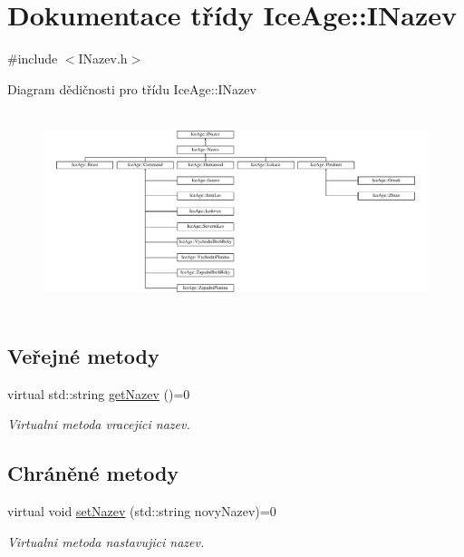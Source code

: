 \hypertarget{classIceAge_1_1INazev}{}\section{Dokumentace třídy Ice\+Age\+:\+:I\+Nazev}
\label{classIceAge_1_1INazev}


{\ttfamily \#include $<$I\+Nazev.\+h$>$}

Diagram dědičnosti pro třídu Ice\+Age\+:\+:I\+Nazev\begin{figure}[H]
\begin{center}
\leavevmode
\includegraphics[height=5.866667cm]{d1/d39/classIceAge_1_1INazev}
\end{center}
\end{figure}
\subsection*{Veřejné metody}
\begin{DoxyCompactItemize}
\item 
virtual std\+::string \hyperlink{classIceAge_1_1INazev_a0731b35c3ffc3234a7e1f9a01c5374f7}{get\+Nazev} ()=0
\begin{DoxyCompactList}\small\item\em Virtualni metoda vracejici nazev. \end{DoxyCompactList}\end{DoxyCompactItemize}
\subsection*{Chráněné metody}
\begin{DoxyCompactItemize}
\item 
virtual void \hyperlink{classIceAge_1_1INazev_a5505f37cebf3dd811c6ca03058a0aa2d}{set\+Nazev} (std\+::string novy\+Nazev)=0
\begin{DoxyCompactList}\small\item\em Virtualni metoda nastavujici nazev. \end{DoxyCompactList}\end{DoxyCompactItemize}


